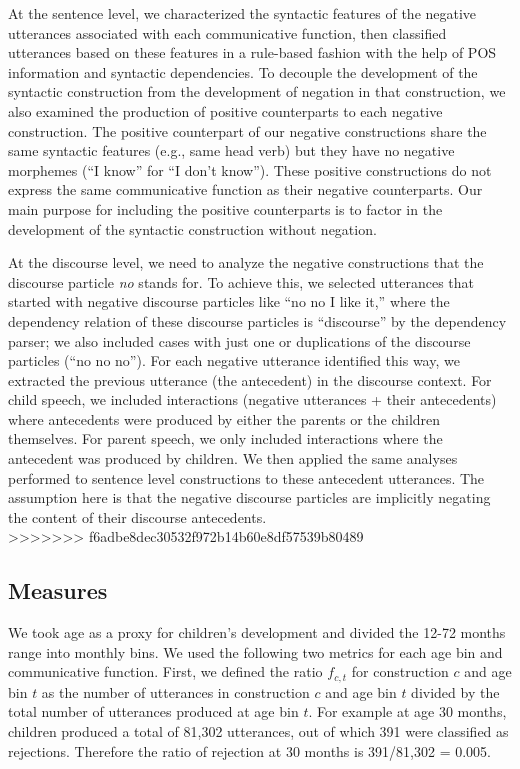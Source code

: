 \documentclass[
  english,
  man,floatsintext]{apa6}
\begin{document}
At the sentence level, we characterized the syntactic features of the negative utterances associated with each communicative function, then classified utterances based on these features in a rule-based fashion with the help of POS information and syntactic dependencies. To decouple the development of the syntactic construction from the development of negation in that construction, we also examined the production of positive counterparts to each negative construction. The positive counterpart of our negative constructions share the same syntactic features (e.g., same head verb) but they have no negative morphemes (``I know'' for ``I don't know''). These positive constructions do not express the same communicative function as their negative counterparts. Our main purpose for including the positive counterparts is to factor in the development of the syntactic construction without negation.

At the discourse level, we need to analyze the negative constructions that the discourse particle \emph{no} stands for. To achieve this, we selected utterances that started with negative discourse particles like ``no no I like it,'' where the dependency relation of these discourse particles is ``discourse'' by the dependency parser; we also included cases with just one or duplications of the discourse particles (``no no no''). For each negative utterance identified this way, we extracted the previous utterance (the antecedent) in the discourse context. For child speech, we included interactions (negative utterances + their antecedents) where antecedents were produced by either the parents or the children themselves. For parent speech, we only included interactions where the antecedent was produced by children. We then applied the same analyses performed to sentence level constructions to these antecedent utterances. The assumption here is that the negative discourse particles are implicitly negating the content of their discourse antecedents.\\
\textgreater\textgreater\textgreater\textgreater\textgreater\textgreater\textgreater{} f6adbe8dec30532f972b14b60e8df57539b80489

\hypertarget{measures}{%
\subsection{Measures}\label{measures}}

We took age as a proxy for children's development and divided the 12-72 months range into monthly bins. We used the following two metrics for each age bin and communicative function. First, we defined the ratio \(f_{c,t}\) for construction \(c\) and age bin \(t\) as the number of utterances in construction \(c\) and age bin \(t\) divided by the total number of utterances produced at age bin \(t\). For example at age 30 months, children produced a total of 81,302 utterances, out of which 391 were classified as rejections. Therefore the ratio of rejection at 30 months is 391/81,302 = 0.005.
\end{document}
